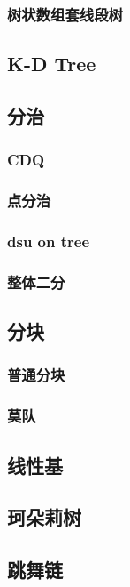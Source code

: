 \documentclass[twocolumn,a4]{article}
\newcommand{\addcpp}[1]{}
\begin{document}
		\subsubsection{树状数组套线段树}
			\addcpp{datastruct/fenwick_seg}
	\subsection{K-D Tree}
		\addcpp{datastruct/kdtree} 
	\subsection{分治}
		\subsubsection{CDQ}
			\addcpp{datastruct/cdq_strictly}
			\addcpp{datastruct/cdq}
		\subsubsection{点分治}
		\subsubsection{dsu on tree}
			\addcpp{datastruct/dsu_on_tree}
		\subsubsection{整体二分}
	\subsection{分块}
		\subsubsection{普通分块}
			\addcpp{datastruct/block}
		\subsubsection{莫队}
			\addcpp{datastruct/motao}
	\subsection{线性基}
		\addcpp{datastruct/linear_base}
	\subsection{珂朵莉树}
		\addcpp{datastruct/chtholly}
	\subsection{跳舞链}
\end{document}
